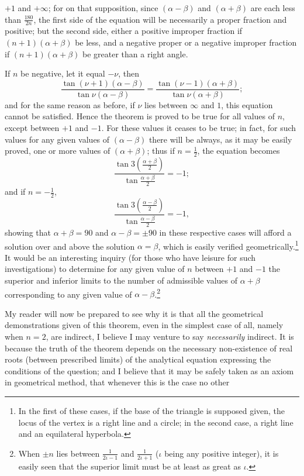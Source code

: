 \documentclass[11pt]{article}
\newcommand{\sourcepage}[1]{\marginpar{\scriptsize p.~#1}}
\begin{document}
{{\sourcepage{394}
$+1$ and $+\infty$; for on that supposition, since $(\alpha-\beta)$ and $(\alpha+\beta)$ are each less than $\frac{180}{2n}$, the first side of the equation will be necessarily a proper fraction and positive; but the second side, either a positive improper fraction if $(n+1)(\alpha+\beta)$ be less, and a negative proper or a negative improper fraction if $(n+1)(\alpha+\beta)$ be greater than a right angle.

If $n$ be negative, let it equal $-\nu$, then
\[
\frac{\tan(\nu+1)(\alpha-\beta)}{\tan\nu(\alpha-\beta)}
=
\frac{\tan(\nu-1)(\alpha+\beta)}{\tan\nu(\alpha+\beta)};
\]
and for the same reason as before, if $\nu$ lies between $\infty$ and $1$, this equation cannot be satisfied. Hence the theorem is proved to be true for all values of $n$, except between $+1$ and $-1$. For these values it ceases to be true; in fact, for such values for any given values of $(\alpha-\beta)$ there will be always, as it may be easily proved, one or more values of $(\alpha+\beta)$; thus if $n=\frac12$, the equation becomes
\[
\frac{\tan 3\left(\frac{\alpha+\beta}{2}\right)}{\tan\frac{\alpha+\beta}{2}}=-1;
\]
and if $n=-\frac12$,
\[
\frac{\tan 3\left(\frac{\alpha-\beta}{2}\right)}{\tan\frac{\alpha-\beta}{2}}=-1,
\]
showing that $\alpha+\beta=90$ and $\alpha-\beta=\pm90$ in these respective cases will afford a solution over and above the solution $\alpha=\beta$, which is easily verified geometrically.\footnote{In the first of these cases, if the base of the triangle is supposed given, the locus of the vertex is a right line and a circle; in the second case, a right line and an equilateral hyperbola.} It would be an interesting inquiry (for those who have leisure for such investigations) to determine for any given value of $n$ between $+1$ and $-1$ the superior and inferior limits to the number of admissible values of $\alpha+\beta$ corresponding to any given value of $\alpha-\beta$.\footnote{When $\pm n$ lies between $\frac1{2\iota-1}$ and $\frac1{2\iota+1}$ ($\iota$ being any positive integer), it is easily seen that the superior limit must be at least as great as $\iota$.}

My reader will now be prepared to see why it is that all the geometrical demonstrations given of this theorem, even in the simplest case of all, namely when $n=2$, are indirect, I believe I may venture to say \emph{necessarily} indirect. It is because the truth of the theorem depends on the necessary non-existence of real roots (between prescribed limits) of the analytical equation expressing the conditions of the question; and I believe that it may be safely taken as an axiom in geometrical method, that whenever this is the case no other

}}
\end{document}
